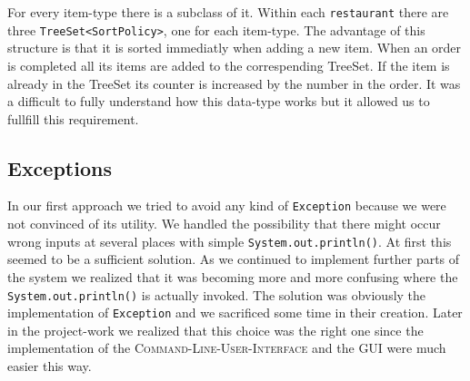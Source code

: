 

For every item-type there is a subclass of it. Within each 
\lstinline|restaurant| there are three \lstinline|TreeSet<SortPolicy>|, one for each 
item-type. The advantage of this structure is that it is sorted immediatly when adding a new 
item. When an order is completed all its items are added to the correspending TreeSet.
If the item is already in the TreeSet its counter is increased by the number in the 
order. It was a difficult to fully understand how this data-type works but it allowed us
to fullfill this requirement.


\subsection{Exceptions}
\label{sub:exceptions}

In our first approach we tried to avoid any kind of \lstinline|Exception| because we were
not convinced of its utility. We handled the possibility that there might occur wrong inputs at
several places with simple \lstinline|System.out.println()|. At first this seemed to be a
sufficient solution. As we continued to implement further parts of the system we realized that it
was becoming more and more confusing where the \lstinline|System.out.println()| is actually 
invoked. The solution was obviously the implementation of \lstinline|Exception| and we sacrificed
some time in their creation. Later in the project-work we realized that this choice was the right
one since the implementation of the \textsc{Command-Line-User-Interface} and the \textsc{GUI} were
much easier this way.

